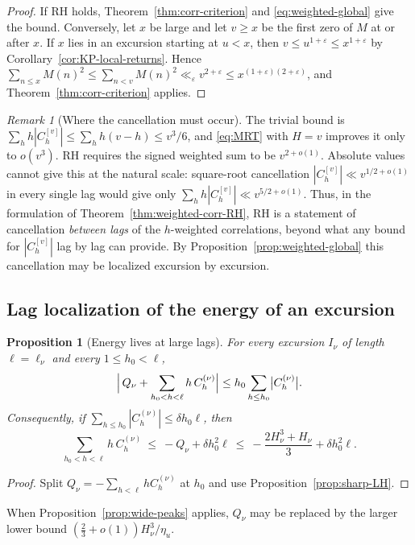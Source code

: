 \documentclass[11pt]{amsart}
\numberwithin{equation}{section}
\theoremstyle{plain}
\newtheorem{proposition}[theorem]{Proposition}
\theoremstyle{definition}
\theoremstyle{remark}
\newtheorem{remark}[theorem]{Remark}
\newcommand{\eps}{\varepsilon}
\begin{document}
\begin{proof}
If RH holds, Theorem~\ref{thm:corr-criterion} and
\eqref{eq:weighted-global} give the bound. Conversely, let $x$ be large and
let $v\ge x$ be the first zero of $M$ at or after $x$. If $x$ lies in an
excursion starting at $u<x$, then $v\le u^{1+\eps}\le x^{1+\eps}$ by
Corollary~\ref{cor:KP-local-returns}. Hence
$\sum_{n\le x}M(n)^2\le\sum_{n<v}M(n)^2\ll_\eps v^{2+\eps}
\le x^{(1+\eps)(2+\eps)}$, and Theorem~\ref{thm:corr-criterion} applies.
\end{proof}

\begin{remark}[Where the cancellation must occur]
\label{rem:cross-lag}
The trivial bound is $\sum_hh|C^{[v]}_h|\le\sum_hh(v-h)\le v^3/6$, and
\eqref{eq:MRT} with $H=v$ improves it only to $o(v^3)$. RH requires the
signed weighted sum to be $v^{2+o(1)}$. Absolute values cannot give this at
the natural scale: square-root cancellation $|C^{[v]}_h|\ll v^{1/2+o(1)}$ in
every single lag would give only $\sum_hh|C^{[v]}_h|\ll v^{5/2+o(1)}$. Thus,
in the formulation of Theorem~\ref{thm:weighted-corr-RH}, RH is a
statement of cancellation \emph{between lags} of the $h$-weighted
correlations, beyond what any bound for $|C^{[v]}_h|$ lag by lag can
provide. By Proposition~\ref{prop:weighted-global} this cancellation may be
localized excursion by excursion.
\end{remark}

\subsection{Lag localization of the energy of an excursion}

\begin{proposition}[Energy lives at large lags]
\label{prop:lag-localization}
For every excursion $I_\nu$ of length $\ell=\ell_\nu$ and every
$1\le h_0<\ell$,
\[
\Bigl|\,Q_\nu+\sum_{h_0<h<\ell}h\,C^{(\nu)}_h\Bigr|
\le h_0\sum_{h\le h_0}\bigl|C^{(\nu)}_h\bigr| .
\]
Consequently, if $\sum_{h\le h_0}|C^{(\nu)}_h|\le\delta h_0\ell$, then
\[
\sum_{h_0<h<\ell}h\,C^{(\nu)}_h\ \le\ -Q_\nu+\delta h_0^2\ell
\ \le\ -\frac{2H_\nu^3+H_\nu}3+\delta h_0^2\ell .
\]
\end{proposition}

\begin{proof}
Split $Q_\nu=-\sum_{h<\ell}hC^{(\nu)}_h$ at $h_0$ and use
Proposition~\ref{prop:sharp-LH}.
\end{proof}

When Proposition~\ref{prop:wide-peaks} applies, $Q_\nu$ may be replaced by
the larger lower bound $(\frac23+o(1))H_\nu^3/\eta_{u}$.
\end{document}
